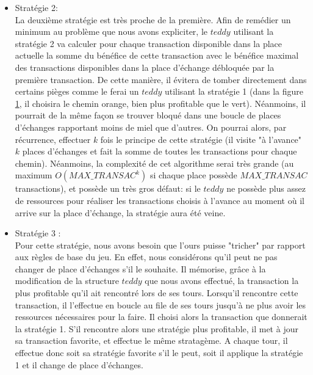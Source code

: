 \documentclass{article}
\begin{document}
\begin{itemize}
\begin{figure}[h]
\begin{tikzpicture}[->,>=stealth, shorten >=1pt,auto,node distance=3.5cm,semithick]
    \end{tikzpicture}
    \caption{Schéma illustrant un défaut de la stratégie 1}
    \begin{itemize}
        \item {\textit{Catane: 0(1,3) signifie que l'indice de "catane" est 0, et qu'on peut y faire 2 transactions qui débloquent respectivement les places d'indice 1 et 3.}}
        \item  {\textit{La valeur dans les cercle représente le bénéfice de la transaction correspondante.}}

    \end{itemize}
    
    \label{fig: Strat1}
    \end{figure}
    
    \item Stratégie 2:\\
    La deuxième stratégie est très proche de la première. Afin de remédier un minimum au problème que nous avons expliciter, le $teddy$ utilisant la stratégie 2 va calculer pour chaque transaction disponible dans la place actuelle la somme du bénéfice de cette transaction avec le bénéfice maximal des transactions disponibles dans la place d'échange débloquée par la première transaction. De cette manière, il évitera de tomber directement dans certains pièges comme le ferai un $teddy$ utilisant la stratégie 1 (dans la figure \ref{fig: Strat1}, il choisira le chemin orange, bien plus profitable que le vert). Néanmoins, il pourrait de la même façon se trouver bloqué dans une boucle de places d'échanges rapportant moins de miel que d'autres. On pourrai alors, par récurrence, effectuer $k$ fois le principe de cette stratégie (il visite "à l'avance" $k$ places d'échanges et fait la somme de toutes les transactions pour chaque chemin). Néanmoins, la complexité de cet algorithme serai très grande (au maximum $O(MAX\_TRANSAC^k)$ si chaque place possède $MAX\_TRANSAC$ transactions), et possède un très gros défaut: si le $teddy$ ne possède plus assez de ressources pour réaliser les transactions choisis à l'avance au moment où il arrive sur la place d'échange, la stratégie aura été veine. 
    \item Stratégie 3 :\\
    Pour cette stratégie, nous avons besoin que l'ours puisse "tricher" par rapport aux règles de base du jeu. En effet, nous considérons qu'il peut ne pas changer de place d'échanges s'il le souhaite. Il mémorise, grâce à la modification de la structure $teddy$ que nous avons effectué, la transaction la plus profitable qu'il ait rencontré lors de ses tours. Lorsqu'il rencontre cette transaction, il l'effectue en boucle au file de ses tours jusqu'à ne plus avoir les ressources nécessaires pour la faire. Il choisi alors la transaction que donnerait la stratégie 1. S'il rencontre alors une stratégie plus profitable, il met à jour sa transaction favorite, et effectue le même stratagème. A chaque tour, il effectue donc soit sa stratégie favorite s'il le peut, soit il applique la stratégie 1 et il change de place d'échanges.
    

\end{itemize}
\end{document}
